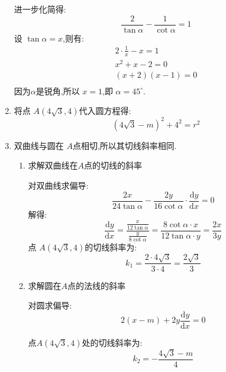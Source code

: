 \documentclass[answers]{exam}
\begin{document}
\begin{questions}
\begin{solution}
\begin{enumerate}[label=\arabic*., noitemsep]
			      进一步化简得:
			      \begin{equation*}
				      \frac{2}{\tan\alpha} - \frac{1}{\cot\alpha} = 1
			      \end{equation*}
			      设 $\tan\alpha=x$,则有:
			      \begin{align*}
				      2\cdot\frac1x - x = 1 \\
				      x^2 +x - 2 = 0        \\
				      (x+2)(x-1) = 0        \\
			      \end{align*}
			      因为$\alpha$是锐角,所以 $x=1$,即 \( \alpha=45^\circ \).
			\item 将点 \( A(4\sqrt{3}, 4) \)代入圆方程得:
			      \begin{equation*}
				      (4\sqrt{3} - m)^2 + 4^2 = r^2 \tag{a}
			      \end{equation*}
			\item 双曲线与圆在 $A$点相切,所以其切线斜率相同.
			      \begin{enumerate}[label=\alph*., noitemsep]
				      \item 求解双曲线在$A$点的切线的斜率

				            对双曲线求偏导:
				            \begin{equation*}
					            \frac{2x}{24\tan\alpha} - \frac{2y}{16\cot\alpha}\cdot\frac{\text{d}y}{\text{d} x} = 0
				            \end{equation*}
				            解得:
				            \begin{equation*}
					            \frac{\text{d}y}{\text{d}x} = \frac{\frac{x}{12\tan\alpha}}{\frac{y}{8\cot\alpha}}
					            = \frac{8\cot\alpha\cdot x}{12\tan\alpha\cdot y} = \frac{2x}{3y}
				            \end{equation*}
				            点 \( A(4\sqrt{3},4) \)的切线斜率为:
				            \begin{equation*}
					            k_1 = \frac{2\cdot4\sqrt{3}}{3\cdot4} =
					            \frac{2\sqrt{3}}{3}
				            \end{equation*}
				      \item 求解圆在$A$点的法线的斜率

				            对圆求偏导:
				            \begin{equation*}
					            2(x-m) + 2y\frac{\text{d}y}{\text{d}x} = 0
				            \end{equation*}

				            点$A(4\sqrt{3},4)$处的切线斜率为:
				            \begin{equation*}
					            k_2 = -\frac{4\sqrt{3} - m}{4}
				            \end{equation*}


\end{enumerate}
\end{enumerate}
\end{solution}
\end{questions}
\end{document}
